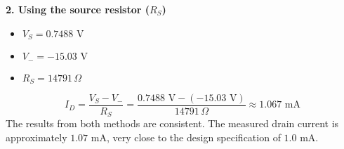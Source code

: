 \documentclass{article}
\begin{document}
\textbf{2. Using the source resistor ($R_S$)}
\begin{itemize}
  \item
    $V_S = 0.7488 \text{ V}$
  \item $V_{-} = -15.03 \text{ V}$
  \item $R_S = 14791 \,
    \Omega$
\end{itemize} $$ I_D = \frac{V_S - V_{-}}{R_S} = \frac{0.7488 \text{ V}
- (-15.03 \text{ V})}{14791 \, \Omega} \approx 1.067 \text{ mA} $$ The results
from both methods are consistent. The measured drain current is approximately
\textbf{$1.07 \text{ mA}$}, very close to the design specification of $1.0
\text{ mA}$.
\end{document}
